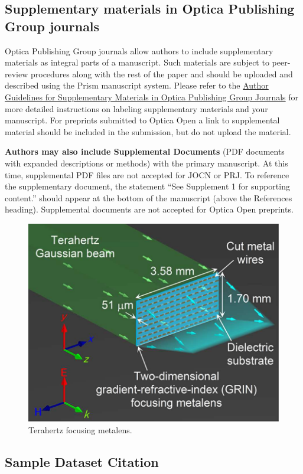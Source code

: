\documentclass[9pt,twocolumn,twoside]{opticajnl}
\begin{document}
\subsection{Supplementary materials in Optica Publishing Group journals}
Optica Publishing Group journals allow authors to include supplementary materials as integral parts of a manuscript. Such materials are subject to peer-review procedures along with the rest of the paper and should be uploaded and described using the Prism manuscript system. Please refer to the \href{https://opg.optica.org/submit/style/supplementary_materials.cfm}{Author Guidelines for Supplementary Materials in Optica Publishing Group Journals} for more detailed instructions on labeling supplementary materials and your manuscript. For preprints submitted to Optica Open a link to supplemental material should be included in the submission, but do not upload the material.

\textbf{Authors may also include Supplemental Documents} (PDF documents with expanded descriptions or methods) with the primary manuscript. At this time, supplemental PDF files are not accepted for JOCN or PRJ. To reference the supplementary document, the statement ``See Supplement 1 for supporting content.'' should appear at the bottom of the manuscript (above the References heading). Supplemental documents are not accepted for Optica Open preprints.

\begin{figure}[ht!]
\centering\includegraphics{opticafig2}
\caption{Terahertz focusing metalens.}
\end{figure}


\subsection{Sample Dataset Citation}
\end{document}
